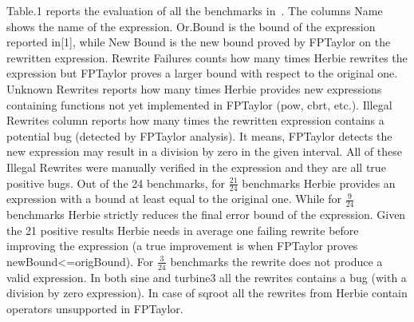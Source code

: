 \documentclass[runningheads]{llncs}
\begin{document}
Table.1 reports the evaluation of all the benchmarks in~\cite{fptaylor}. The columns Name shows the name of the expression. Or.Bound is the bound of the expression reported in[1], while New Bound is the new bound proved by FPTaylor on the rewritten expression. Rewrite Failures counts how many times Herbie rewrites the expression but FPTaylor proves a larger bound with respect to the original one.
Unknown Rewrites reports how many times Herbie provides new expressions containing functions not yet implemented in FPTaylor (pow, cbrt, etc.). Illegal Rewrites column reports how many times the rewritten expression contains a potential bug (detected by FPTaylor analysis). It means, FPTaylor detects the new expression may result in a division by zero in the given interval. All of these Illegal Rewrites were manually verified in the expression and they are all true positive bugs.
Out of the 24 benchmarks, for $\frac{21}{24}$ benchmarks Herbie provides an expression with a bound at least equal to the original one. While for $\frac{9}{24}$ benchmarks Herbie strictly reduces the final error bound of the expression. 
Given the 21 positive results Herbie needs in average one failing rewrite before improving the expression (a true improvement is when FPTaylor proves newBound<=origBound).
For $\frac{3}{24}$ benchmarks the rewrite does not produce a valid expression. In both sine and turbine3 all the rewrites contains a bug (with a division by zero expression). 
In case of sqroot all the rewrites from Herbie contain operators unsupported in FPTaylor.
\end{document}
